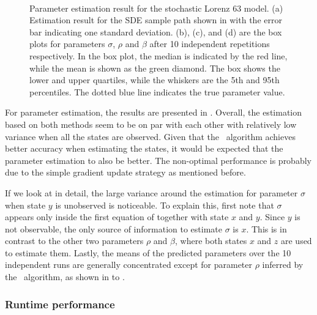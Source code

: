 \begin{figure}
\begin{subfigure}{0.48\textwidth}
        \caption{\ }
        \label{fig-lorenz-63-parameters-beta-boxplot}
    \end{subfigure}
    \caption{Parameter estimation result for the stochastic Lorenz 63 model. (a) Estimation result for the SDE sample path shown in  with the error bar indicating one standard deviation. (b), (c), and (d) are the box plots for parameters $\sigma$,  $\rho$ and $\beta$ after 10 independent repetitions respectively. In the box plot, the median is indicated by the red line, while the mean is shown as the green diamond. The box shows the lower and upper quartiles, while the whiskers are the 5th and 95th percentiles. The dotted blue line indicates the true parameter value.}
    \label{fig-lorenz-63-parameters-group}
\end{figure}

For parameter estimation, the results are presented in .
Overall, the estimation based on both methods seem to be on par with each other with relatively low variance when all the states are observed.
Given that the \algovgpamap\ algorithm achieves better accuracy when estimating the states, it would be expected that the parameter estimation to also be better.
The non-optimal performance is probably due to the simple gradient update strategy as mentioned before.

If we look at  in detail, the large variance around the estimation for parameter $\sigma$ when state $y$ is unobserved is noticeable.
To explain this, first note that $\sigma$ appears only inside the first equation of  together with state $x$ and $y$.
Since $y$ is not observable, the only source of information to estimate $\sigma$ is  $x$.
This is in contrast to the other two parameters $\rho$ and $\beta$, where both states $x$ and $z$ are used to estimate them.
Lastly, the means of the predicted parameters over the 10 independent runs are generally concentrated except for parameter $\rho$ inferred by the \algovgpamap\ algorithm, as shown in  to .

\subsubsection*{Runtime performance}

